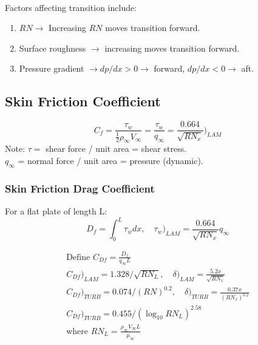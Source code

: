 \documentclass[draft=false, titlepage]{article}
\begin{document}
\paragraph*{} Factors affecting transition include:
\begin{enumerate}
	\item $RN \rightarrow $ Increasing $RN$ moves transition forward.
	\item Surface roughness $\rightarrow$ increasing moves transition forward.
	\item Pressure gradient $\rightarrow dp/dx > 0 \rightarrow $ forward, $dp/dx < 0 \rightarrow$ aft.
\end{enumerate}

\subsection{Skin Friction Coefficient}
\begin{equation}
C_f = \frac{\tau_w}{\frac{1}{2}\rho_\infty V_\infty} = \frac{\tau_w}{q_\infty} = \frac{0.664}{\sqrt{RN_x}}\Big)_{LAM}
\label{eq:skinFriction}
\end{equation}
Note: $\tau =$ shear force / unit area = shear stress.\\
$q_\infty$ = normal force / unit area = pressure (dynamic).
\subsubsection{Skin Friction Drag Coefficient}
For a flat plate of length L:
\begin{equation}
D_f  = \int_0^L \tau_w dx,\quad \tau_w\big)_{LAM} = \frac{0.664}{\sqrt{RN_x}}q_\infty
\label{eq:skinFrictionDrag}
\end{equation}

\begin{gather*}
\text{Define } C_{Df} = \frac{D_f}{q_\infty L}\\C_{Df}\Big)_{LAM} = 1.328/\sqrt{RN_L},\quad \delta\Big)_{LAM} = \frac{5.2x}{\sqrt{RN_x}}\\
C_{Df}\Big)_{TURB} = 0.074/(RN)^{0.2},\quad \delta\Big)_{TURB} = \frac{0.37x}{(RN_x)^{0.2}}\\
C_{Df}\Big)_{TURB} = 0.455/(\log_{10}RN_L)^{2.58}\\
\text{where } RN_L = \frac{\rho_\infty V_\infty L}{\mu_\infty}
\end{gather*}
\end{document}

